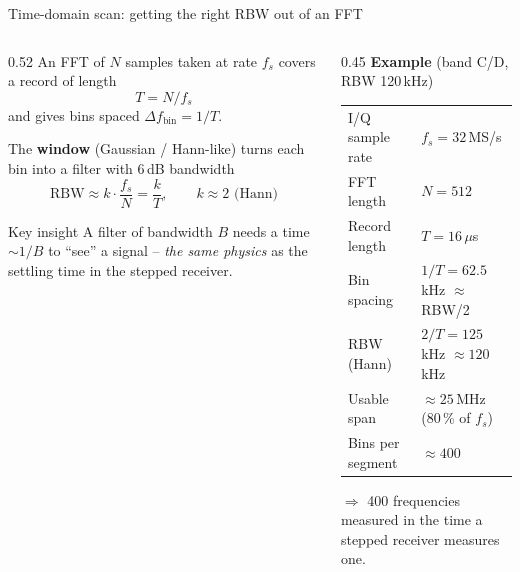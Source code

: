 \documentclass[aspectratio=169]{beamer}
\begin{document}
\begin{frame}{Time-domain scan: getting the right RBW out of an FFT}

\begin{columns}[T]
\begin{column}{0.52\textwidth}
  \small
  An FFT of $N$ samples taken at rate $f_s$ covers a record of length
  \[ T = N/f_s \]
  and gives bins spaced $\Delta f_\text{bin} = 1/T$.

  \medskip
  The \textbf{window} (Gaussian / Hann-like) turns each bin into a filter
  with 6\,dB bandwidth
  \[ \mathrm{RBW} \approx k\cdot\frac{f_s}{N} = \frac{k}{T},
     \qquad k\approx 2 \text{ (Hann)} \]

  \vspace{-2mm}
  \begin{block}{Key insight}
    \small A filter of bandwidth $B$ needs a time $\sim 1/B$ to ``see'' a
    signal -- \emph{the same physics} as the settling time in the
    stepped receiver.
  \end{block}
\end{column}
\begin{column}{0.45\textwidth}
  \textbf{Example} (band C/D, RBW 120\,kHz)

  \smallskip
  \footnotesize
  \begin{tabular}{@{}ll@{}}
    \toprule
    I/Q sample rate  & $f_s = 32$\,MS/s \\
    FFT length       & $N = 512$ \\
    Record length    & $T = 16\,\mu$s \\
    Bin spacing      & $1/T = 62.5$\,kHz $\approx$ RBW/2 \\
    RBW (Hann)       & $2/T = 125$\,kHz $\approx 120$\,kHz \\
    Usable span      & $\approx 25$\,MHz (80\,\% of $f_s$) \\
    Bins per segment & $\approx 400$ \\
    \bottomrule
  \end{tabular}

  \medskip
  \small
  $\Rightarrow$ 400 frequencies measured in the time a stepped receiver
  measures \alert{one}.
\end{column}
\end{columns}

\end{frame}
\end{document}
